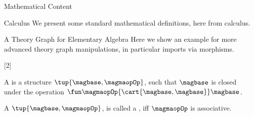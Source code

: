 \documentclass{omdoc}
\begin{document}
 


\begin{omgroup}[id=sec.math]{Mathematical Content}
  \begin{omgroup}{Calculus}
    We present some standard mathematical definitions, here from calculus.
\end{omgroup}

\begin{omgroup}[id=sec.math]{A Theory Graph for Elementary Algebra}
  Here we show an example for more advanced theory graph manipulations, in particular
  imports via morphisms.

\begin{module}[name=magma]
  [2]{\infix{}}
  \begin{definition}[id=magma.def]
    A  is a structure $\tup{\magbase,\magmaopOp}$, such that $\magbase$ is
    closed under the operation $\fun\magmaopOp{\cart{\magbase,\magbase}}\magbase$.
 \end{definition}
\end{module}

\begin{module}[name=semigroup]
  \begin{definition}[id=semigroup.def]
    A  $\tup{\magbase,\magmaopOp}$, is called a , iff
    $\magmaopOp$ is associative.
  \end{definition}
\end{module}

\end{omgroup}
\end{omgroup}
\end{document}
